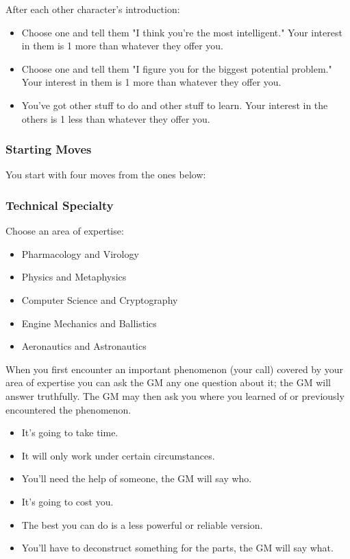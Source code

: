 After each other character's introduction:
\begin{itemize}
\item Choose one and tell them "I think you're the most intelligent." Your interest in them is 1 more than whatever they offer you.
\item Choose one and tell them "I figure you for the biggest potential problem." Your interest in them is 1 more than whatever they offer you.
\item You’ve got other stuff to do and other stuff to learn. Your interest in the others is 1 less than whatever they offer you.
\end{itemize}

\subsubsection{Starting Moves}
You start with four moves from the ones below:

\subsubsection{Technical Specialty}\label{sec:Technical Specialty}
Choose an area of expertise:
\begin{itemize}
\item Pharmacology and Virology
\item Physics and Metaphysics
\item Computer Science and Cryptography
\item Engine Mechanics and Ballistics
\item Aeronautics and Astronautics
\end{itemize}
When you first encounter an important phenomenon (your call) covered by your area of expertise you can ask the GM any one question about it; the GM will answer truthfully. The GM may then ask you where you learned of or previously encountered the phenomenon.

\begin{itemize}
\item It's going to take time.
\item It will only work under certain circumstances.
\item You'll need the help of someone, the GM will say who.
\item It's going to cost you.
\item The best you can do is a less powerful or reliable version.
\item You’ll have to deconstruct something for the parts, the GM will say what.
\end{itemize}


